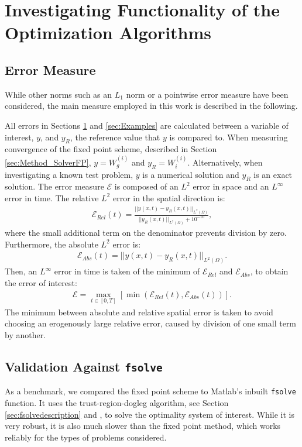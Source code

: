 \documentclass[11pt, a4paper]{article}
\theoremstyle{definition}
\begin{document}
\section{Investigating Functionality of the Optimization Algorithms} \label{sec:Validation}

\subsection{Error Measure}\label{sec:ErrorMeasure}
While other norms such as an $L_1$ norm or a pointwise error measure have been considered, the main measure employed in this work is described in the following.

All errors in Sections \ref{sec:Validation} and \ref{sec:Examples} are calculated between a variable of interest, $y$, and $y_R$, the reference value that $y$ is compared to. When measuring convergence of the fixed point scheme, described in Section \ref{sec:Method_SolverFP}, $y = W^{(i)}_g$ and $y_R = W^{(i)}_i$. Alternatively, when investigating a known test problem, $y$ is a numerical solution and $y_R$ is an exact solution. The error measure $\mathcal{E}$ is composed of an $L^2$ error in space and an $L^\infty$ error in time. The relative $L^2$ error in the spatial direction is:
\begin{align*}
\mathcal{E}_{Rel}(t) = \frac{|| y(x,t) - y_{R}(x,t)||_{L^2(\Omega)} }{||y_R(x,t) ||_{L^2(\Omega)}+ 10^{-10}},
\end{align*}
where the small additional term on the denominator prevents division by zero.
Furthermore, the absolute $L^2$ error is:
\begin{align*}
\mathcal{E}_{Abs}(t) = || y(x,t) - y_R(x,t)||_{L^2(\Omega)}.
\end{align*}
Then, an $L^\infty$ error in time is taken of the minimum of $\mathcal{E}_{Rel}$ and $\mathcal{E}_{Abs}$, to obtain the error of interest:
\begin{align*}
\mathcal{E} = \max_{t \in [0,T]}\left[\min\left(\mathcal{E}_{Rel}(t), \mathcal{E}_{Abs}(t)\right)\right].
\end{align*}
The minimum between absolute and relative spatial error is taken to avoid choosing an erogenously large relative error, caused by division of one small term by another.




\subsection{Validation Against \texttt{fsolve}}
As a benchmark, we compared the fixed point scheme to Matlab's inbuilt \texttt{fsolve} function. It uses the trust-region-dogleg algorithm, see Section \ref{sec:fsolvedescription} and \cite{Powell1}, to solve the optimality system of interest. While it is very robust, it is also much slower than the fixed point method, which works reliably for the types of problems considered. 

\end{document}
